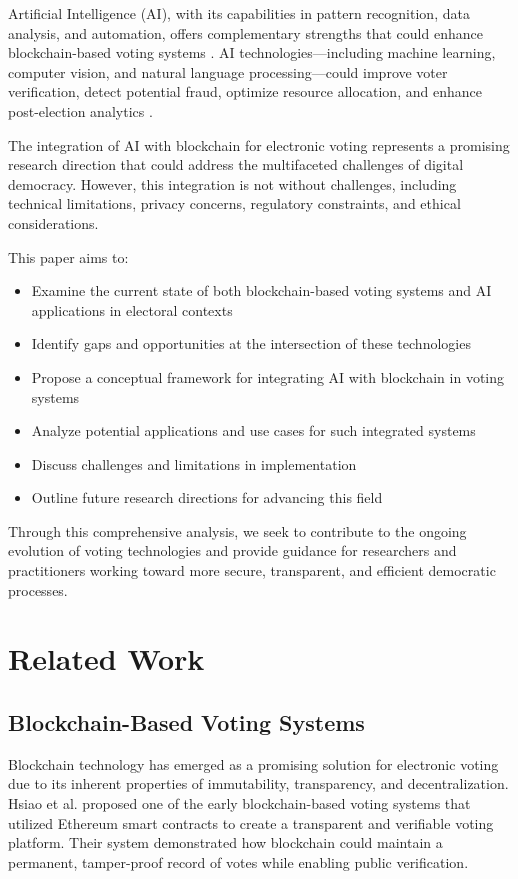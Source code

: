 \documentclass[conference]{IEEEtran}
\begin{document}
Artificial Intelligence (AI), with its capabilities in pattern recognition, data analysis, and automation, offers complementary strengths that could enhance blockchain-based voting systems \cite{b4}. AI technologies—including machine learning, computer vision, and natural language processing—could improve voter verification, detect potential fraud, optimize resource allocation, and enhance post-election analytics \cite{b5}.

The integration of AI with blockchain for electronic voting represents a promising research direction that could address the multifaceted challenges of digital democracy. However, this integration is not without challenges, including technical limitations, privacy concerns, regulatory constraints, and ethical considerations.

This paper aims to:
\begin{itemize}
    \item Examine the current state of both blockchain-based voting systems and AI applications in electoral contexts
    \item Identify gaps and opportunities at the intersection of these technologies
    \item Propose a conceptual framework for integrating AI with blockchain in voting systems
    \item Analyze potential applications and use cases for such integrated systems
    \item Discuss challenges and limitations in implementation
    \item Outline future research directions for advancing this field
\end{itemize}

Through this comprehensive analysis, we seek to contribute to the ongoing evolution of voting technologies and provide guidance for researchers and practitioners working toward more secure, transparent, and efficient democratic processes.

\section{Related Work}
\subsection{Blockchain-Based Voting Systems}
Blockchain technology has emerged as a promising solution for electronic voting due to its inherent properties of immutability, transparency, and decentralization. Hsiao et al. \cite{b6} proposed one of the early blockchain-based voting systems that utilized Ethereum smart contracts to create a transparent and verifiable voting platform. Their system demonstrated how blockchain could maintain a permanent, tamper-proof record of votes while enabling public verification.
\end{document}
